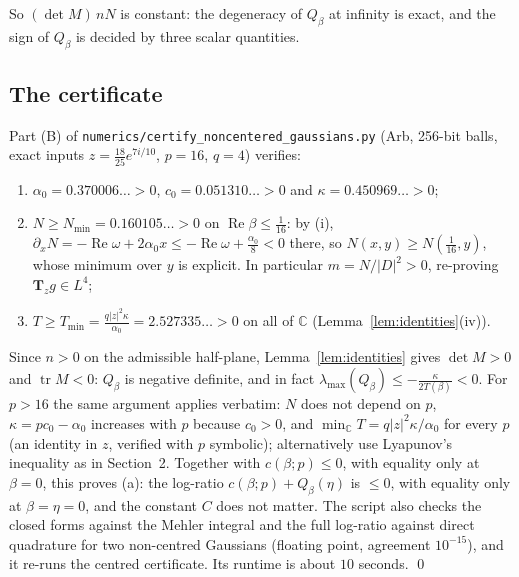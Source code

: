 \documentclass[11pt]{amsart}
\theoremstyle{definition}
\newcommand{\C}{\mathbb{C}}
\newcommand{\Rea}{\operatorname{Re}}
\newcommand{\bT}{\mathbf{T}}
\begin{document}
So $(\det M)\,nN$ is constant: the degeneracy of $Q_\beta$ at infinity is exact, and the sign of $Q_\beta$ is decided by
three scalar quantities.

\subsection{The certificate}\label{sec:cert}
Part (B) of \texttt{numerics/\allowbreak certify\_noncentered\_gaussians.py} (Arb, 256-bit balls, exact inputs
$z=\frac{18}{25}e^{7i/10}$, $p=16$, $q=4$) verifies:
\begin{enumerate}[label=(\arabic*)]
\item $\alpha_0=0.370006\ldots>0$, $c_0=0.051310\ldots>0$ and $\kappa=0.450969\ldots>0$;
\item $N\ge N_{\min}=0.160105\ldots>0$ on $\Rea\beta\le\frac1{16}$: by (i), $\partial_xN=-\Rea\omega+2\alpha_0x\le-\Rea\omega+\frac{\alpha_0}8<0$
there, so $N(x,y)\ge N(\frac1{16},y)$, whose minimum over $y$ is explicit. In particular $m=N/|D|^2>0$, re-proving
$\bT_zg\in L^4$;
\item $T\ge T_{\min}=\frac{q|z|^2\kappa}{\alpha_0}=2.527335\ldots>0$ on all of $\C$ (Lemma~\ref{lem:identities}(iv)).
\end{enumerate}
Since $n>0$ on the admissible half-plane, Lemma~\ref{lem:identities} gives $\det M>0$ and $\operatorname{tr}M<0$: $Q_\beta$ is
negative definite, and in fact $\lambda_{\max}(Q_\beta)\le-\frac{\kappa}{2T(\beta)}<0$. For $p>16$ the same argument
applies verbatim: $N$ does not depend on $p$, $\kappa=pc_0-\alpha_0$ increases with $p$ because $c_0>0$, and
$\min_\C T=q|z|^2\kappa/\alpha_0$ for every $p$ (an identity in $z$, verified with $p$ symbolic); alternatively use
Lyapunov's inequality as in Section~2. Together with $c(\beta;p)\le0$, with equality only at $\beta=0$, this proves (a): the
log-ratio $c(\beta;p)+Q_\beta(\eta)$ is $\le0$, with equality only at $\beta=\eta=0$, and the constant $C$ does not
matter. The script also checks the closed forms against the Mehler integral and the full log-ratio against direct
quadrature for two non-centred Gaussians (floating point, agreement $10^{-15}$), and it re-runs the centred
certificate. Its runtime is about $10$ seconds. \qed
\end{document}
